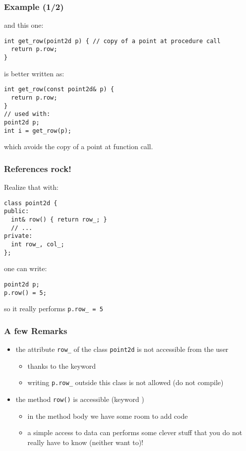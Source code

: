 \documentclass{beamer}
\newcommand{\kw}[1]{{\color{blue}{\texttt{#1}}}\xspace}
\newcommand{\code}[1]{{\scriptsize{\texttt{#1}}}\xspace}
\begin{document}
\begin{frame}[fragile]
  \frametitle{Example (1/2)}

and this one:
\begin{lstlisting}
int get_row(point2d p) { // copy of a point at procedure call
  return p.row;
}
\end{lstlisting}

\smallskip

is better written as:
\begin{lstlisting}
int get_row(const point2d& p) {
  return p.row;
}
// used with:
point2d p;
int i = get_row(p);
\end{lstlisting}
which avoids the copy of a point at function call.

\end{frame}


\begin{frame}[fragile]
  \frametitle{References rock!}

Realize that with:
\begin{lstlisting}
class point2d {
public:
  int& row() { return row_; }
  // ...
private:
  int row_, col_;
};
\end{lstlisting}

one can write:
\begin{lstlisting}
point2d p;
p.row() = 5;
\end{lstlisting}

so it really performs \code{p.row\_ = 5}

\end{frame}


\begin{frame}[fragile]
  \frametitle{A few Remarks}

  \begin{itemize}
  \item the attribute \code{row\_} of the class \code{point2d} is not
    accessible from the user
    \begin{itemize}
    \item thanks to the keyword \kw{private}
    \item writing \code{p.row\_} outside this class is not allowed (do
      not compile)
    \end{itemize}
    \smallskip
  \item the method \code{row()} is accessible (keyword \kw{public})
    \begin{itemize}
    \item in the method body we have some room to add code
    \item a simple access to data can performs some clever stuff that
      you do not really have to know (neither want to)!
    \end{itemize}
  \end{itemize}

\end{frame}
\end{document}
